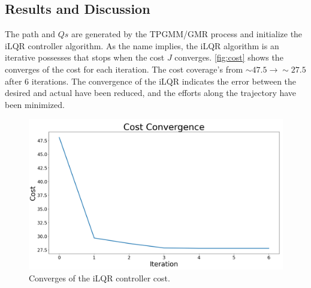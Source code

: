

\subsection{Results and Discussion}



The path and $Qs$ are generated by the TPGMM/GMR process and initialize the iLQR controller algorithm. As the name implies, the iLQR algorithm is an iterative possesses that stops when the cost $J$ converges.  \autoref{fig:cost} shows the converges of the cost for each iteration. The cost coverage's from $\sim47.5 \rightarrow \sim27.5$ after 6 iterations. The convergence of the iLQR indicates the error between the desired and actual have been reduced, and the efforts along the trajectory have been minimized. 

 

\begin{figure}[h!]
    \centering
    \includegraphics[scale=0.22]{images/controllers/Cost_plt3.png}
    \caption[iLQR controller Convergence]{Converges of the iLQR controller cost.}
    \label{fig:cost}
\end{figure}


